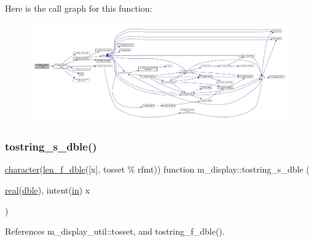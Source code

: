 Here is the call graph for this function\+:
\nopagebreak
\begin{figure}[H]
\begin{center}
\leavevmode
\includegraphics[width=350pt]{namespacem__display_ab2141edcb1746f1aa92e31ed07d597a8_cgraph}
\end{center}
\end{figure}
\mbox{\label{namespacem__display_ac0c020f1b9556f123bfea3ff29cda048}} 
\subsubsection{\texorpdfstring{tostring\+\_\+s\+\_\+dble()}{tostring\_s\_dble()}}
{\footnotesize\ttfamily \hyperlink{option__stopwatch_83_8txt_abd4b21fbbd175834027b5224bfe97e66}{character}(\hyperlink{namespacem__display_aa013a639d5b0f7e40b627c9d712693f0}{len\+\_\+f\+\_\+dble}(\mbox{[}x\mbox{]}, tosset \% rfmt)) function m\+\_\+display\+::tostring\+\_\+s\+\_\+dble (\begin{DoxyParamCaption}\item[{\hyperlink{read__watch_83_8txt_abdb62bde002f38ef75f810d3a905a823}{real}(\hyperlink{namespacem__display_a46d90b75b6ccef7ccade133e5847e815}{dble}), intent(\hyperlink{M__journal_83_8txt_afce72651d1eed785a2132bee863b2f38}{in})}]{x }\end{DoxyParamCaption})\hspace{0.3cm}{\ttfamily [private]}}



References m\+\_\+display\+\_\+util\+::tosset, and tostring\+\_\+f\+\_\+dble().


